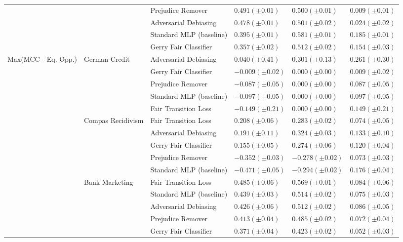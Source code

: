 \begin{tabular}{llllll}
 &  & Prejudice Remover & $0.491 (\pm0.01)$ & $0.500 (\pm0.01)$ & $0.009 (\pm0.01)$ \\
 &  & Adversarial Debiasing & $0.478 (\pm0.01)$ & $0.501 (\pm0.02)$ & $0.024 (\pm0.02)$ \\
 &  & Standard MLP (baseline) & $0.395 (\pm0.01)$ & $0.581 (\pm0.01)$ & $0.185 (\pm0.01)$ \\
 &  & Gerry Fair Classifier & $0.357 (\pm0.02)$ & $0.512 (\pm0.02)$ & $0.154 (\pm0.03)$ \\
\cline{1-6} \cline{2-6}
\multirow[t]{20}{*}{Max(MCC - Eq. Opp.)} & \multirow[t]{5}{*}{German Credit} & Adversarial Debiasing & $0.040 (\pm0.41)$ & $0.301 (\pm0.13)$ & $0.261 (\pm0.30)$ \\
 &  & Gerry Fair Classifier & $-0.009 (\pm0.02)$ & $0.000 (\pm0.00)$ & $0.009 (\pm0.02)$ \\
 &  & Prejudice Remover & $-0.087 (\pm0.05)$ & $0.000 (\pm0.00)$ & $0.087 (\pm0.05)$ \\
 &  & Standard MLP (baseline) & $-0.097 (\pm0.05)$ & $0.000 (\pm0.00)$ & $0.097 (\pm0.05)$ \\
 &  & Fair Transition Loss & $-0.149 (\pm0.21)$ & $0.000 (\pm0.00)$ & $0.149 (\pm0.21)$ \\
\cline{2-6}
 & \multirow[t]{5}{*}{Compas Recidivism} & Fair Transition Loss & $0.208 (\pm0.06)$ & $0.283 (\pm0.02)$ & $0.074 (\pm0.05)$ \\
 &  & Adversarial Debiasing & $0.191 (\pm0.11)$ & $0.324 (\pm0.03)$ & $0.133 (\pm0.10)$ \\
 &  & Gerry Fair Classifier & $0.155 (\pm0.05)$ & $0.274 (\pm0.06)$ & $0.120 (\pm0.04)$ \\
 &  & Prejudice Remover & $-0.352 (\pm0.03)$ & $-0.278 (\pm0.02)$ & $0.073 (\pm0.03)$ \\
 &  & Standard MLP (baseline) & $-0.471 (\pm0.05)$ & $-0.294 (\pm0.02)$ & $0.176 (\pm0.04)$ \\
\cline{2-6}
 & \multirow[t]{5}{*}{Bank Marketing} & Fair Transition Loss & $0.485 (\pm0.06)$ & $0.569 (\pm0.01)$ & $0.084 (\pm0.06)$ \\
 &  & Standard MLP (baseline) & $0.439 (\pm0.03)$ & $0.514 (\pm0.02)$ & $0.075 (\pm0.03)$ \\
 &  & Adversarial Debiasing & $0.426 (\pm0.06)$ & $0.512 (\pm0.02)$ & $0.086 (\pm0.05)$ \\
 &  & Prejudice Remover & $0.413 (\pm0.04)$ & $0.485 (\pm0.02)$ & $0.072 (\pm0.04)$ \\
 &  & Gerry Fair Classifier & $0.371 (\pm0.04)$ & $0.423 (\pm0.02)$ & $0.052 (\pm0.03)$ \\

\end{tabular}

